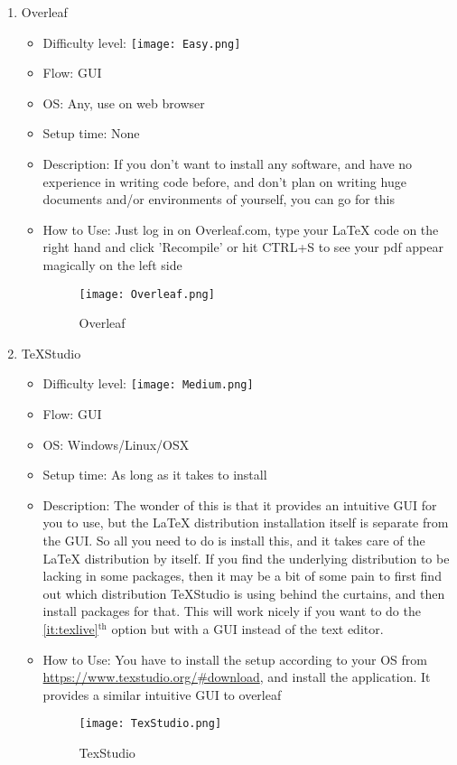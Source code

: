 \documentclass[12pt, letterpaper]{article}
\theoremstyle{remark}
\begin{document}
\begin{enumerate}
    \item Overleaf
        \begin{itemize}
            \item Difficulty level: \texttt{[image: Easy.png]}
            \item Flow: GUI
            \item OS: Any, use on web browser
            \item Setup time: None
            \item Description: If you don't want to install any software, and have no experience in writing code before, and don't plan on writing huge documents and/or environments of yourself, you can go for this
            \item How to Use: Just log in on Overleaf.com, type your \LaTeX{} code on the right hand and click 'Recompile' or hit CTRL+S to see your pdf appear magically on the left side
            \begin{figure}[h]
                \centering
                \texttt{[image: Overleaf.png]}
                \caption{Overleaf}
                \label{fig:Overleaf}
            \end{figure}
            
        \end{itemize}
        \item TeXStudio \label{it:texstudio}
        \begin{itemize}
            \item Difficulty level: \texttt{[image: Medium.png]}
            \item Flow: GUI
            \item OS: Windows/Linux/OSX
            \item Setup time: As long as it takes to install
            \item Description: The wonder of this is that it provides an intuitive GUI for you to use, but the \LaTeX{} distribution installation itself is separate from the GUI. So all you need to do is install this, and it takes care of the \LaTeX{} distribution by itself. If you find the underlying distribution to be lacking in some packages, then it may be a bit of some pain to first find out which distribution TeXStudio is using behind the curtains, and then install packages for that. This will work nicely if you want to do the \ref{it:texlive}$^{\text{th}}$ option but with a GUI instead of the text editor.
            \item How to Use: You have to install the setup according to your OS from \url{https://www.texstudio.org/#download}, and install the application. It provides a similar intuitive GUI to overleaf
             \begin{figure}[h]
                \centering
                \texttt{[image: TexStudio.png]}
                \caption{TexStudio}
                \label{fig:TexStudio}
            \end{figure}
        \end{itemize}
        

\end{enumerate}
\end{document}
